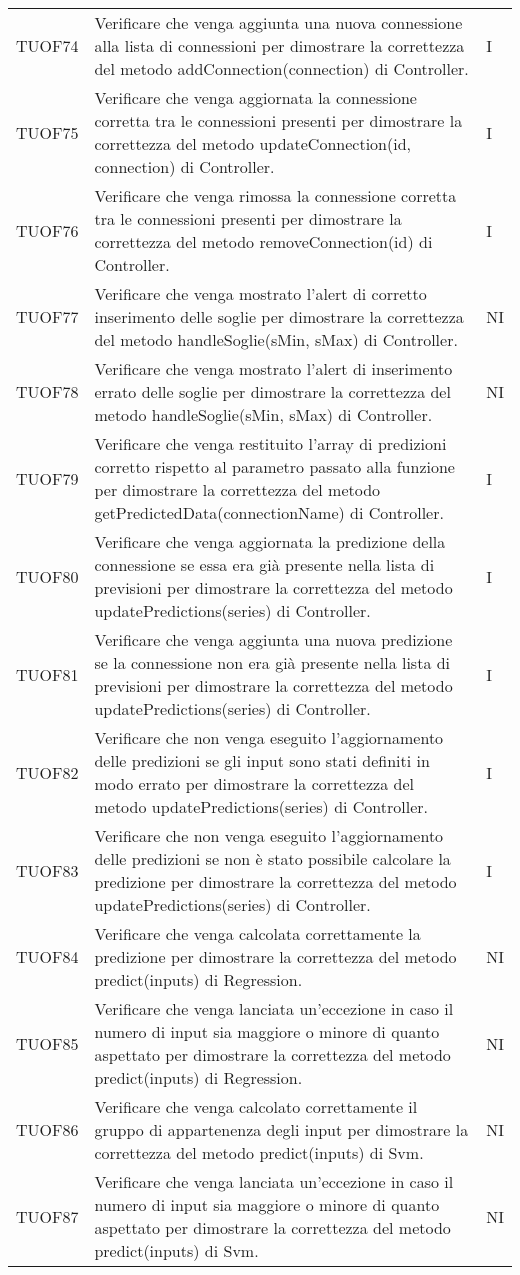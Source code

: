 \begin{longtable}{C{2cm} L{8cm} C{2cm}}
TUOF74 & Verificare che venga aggiunta una nuova connessione alla lista di connessioni per dimostrare la correttezza del metodo addConnection(connection) di Controller. & I \\
TUOF75 & Verificare che venga aggiornata la connessione corretta tra le connessioni presenti per dimostrare la correttezza del metodo updateConnection(id, connection) di Controller. & I \\
TUOF76 & Verificare che venga rimossa la connessione corretta tra le connessioni presenti per dimostrare la correttezza del metodo removeConnection(id) di Controller. & I \\
TUOF77 & Verificare che venga mostrato l'alert di corretto inserimento delle soglie per dimostrare la correttezza del metodo handleSoglie(sMin, sMax) di Controller. & NI \\
TUOF78 & Verificare che venga mostrato l'alert di inserimento errato delle soglie per dimostrare la correttezza del metodo handleSoglie(sMin, sMax) di Controller. & NI \\
TUOF79 & Verificare che venga restituito l'array di predizioni corretto rispetto al parametro passato alla funzione per dimostrare la correttezza del metodo getPredictedData(connectionName) di Controller. & I \\
TUOF80 & Verificare che venga aggiornata la predizione della connessione se essa era già presente nella lista di previsioni per dimostrare la correttezza del metodo updatePredictions(series) di Controller. & I \\
TUOF81 & Verificare che venga aggiunta una nuova predizione se la connessione non era già presente nella lista di previsioni per dimostrare la correttezza del metodo updatePredictions(series) di Controller. & I \\
TUOF82 & Verificare che non venga eseguito l'aggiornamento delle predizioni se gli input sono stati definiti in modo errato per dimostrare la correttezza del metodo updatePredictions(series) di Controller. & I \\
TUOF83 & Verificare che non venga eseguito l'aggiornamento delle predizioni se non è stato possibile calcolare la predizione per dimostrare la correttezza del metodo updatePredictions(series) di Controller. & I \\
TUOF84 & Verificare che venga calcolata correttamente la predizione per dimostrare la correttezza del metodo predict(inputs) di Regression. & NI \\
TUOF85 & Verificare che venga lanciata un'eccezione in caso il numero di input sia maggiore o minore di quanto aspettato per dimostrare la correttezza del metodo predict(inputs) di Regression. & NI \\
TUOF86 & Verificare che venga calcolato correttamente il gruppo di appartenenza degli input per dimostrare la correttezza del metodo predict(inputs) di Svm. & NI \\
TUOF87 & Verificare che venga lanciata un'eccezione in caso il numero di input sia maggiore o minore di quanto aspettato per dimostrare la correttezza del metodo predict(inputs) di Svm. & NI \\

\end{longtable}


